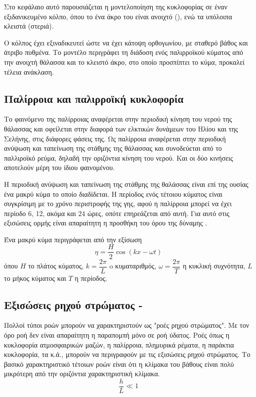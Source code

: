 Στο κεφάλαιο αυτό παρουσιάζεται η μοντελοποίηση της κυκλοφορίας σε έναν εξιδανικευμένο κόλπο, όπου το ένα άκρο του είναι ανοιχτό (), ενώ τα υπόλοιπα κλειστά (στεριά).

Ο κόλπος έχει εξιναδικευτεί ώστε να έχει κάτοψη ορθογωνίου, με σταθερό βάθος και άτριβο πυθμένα. Το μοντέλο περιγράφει τη διάδοση ενός παλιρροϊκού κύματος από την ανοιχτή θάλασσα και το κλειστό άκρο, στο οποίο προσπίπτει το κύμα, προκαλεί τέλεια ανάκλαση.
\subsection{Παλίρροια και παλιρροϊκή κυκλοφορία}
Το φαινόμενο της παλίρροιας αναφέρεται στην περιοδική κίνηση του νερού της θάλασσας και οφείλεται στην διαφορά των ελκτικών δυνάμεων του Ηλίου και της Σελήνης, στις διάφορες φάσεις της.
Ως παλίρροια αναφέρεται στην περιοδική ανύψωση και ταπείνωση της στάθμης της θάλασσας και συνοδεύεται από το παλλιροϊκό ρεύμα, δηλαδή την οριζόντια κίνηση του νερού. Και οι δύο κινήσεις αποτελούν μέρη του ίδιου φαινομένου.

Η περιοδική ανύψωση και ταπείνωση της στάθμης της θαλάσσας είναι επί της ουσίας ένα μακρύ κύμα το οποίο διαδίδεται. Η περίοδος ενός τέτοιου κύματος είναι συγκρίσιμη με το χρόνο περιστροφής της γης, αφού η παλίρροια μπορεί να έχει περίοδο 6, 12, ακόμα και 24 ώρες, οπότε επηρεάζεται από αυτή. Για αυτό στις εξισώσεις ορμής είναι απαραίτητη η προσθήκη του όρου της δύναμης \cor.

Ένα μακρύ κύμα περιγράφεται από την εξίσωση 
\begin{equation}
    η = \dfrac{H}{2}\cos{(kx-ωt)}
\end{equation}
όπου $Η$ το πλάτος κύματος, $k=\dfrac{2π}{L}$ o κυματαριθμός, $ω=\dfrac{2π}{T}$ η κυκλική συχνότητα, $L$ το μήκος κύματος και $T$ η περίοδος.

\subsection{Εξισώσεις ρηχού στρώματος - }
Πολλοί τύποι ροών μπορούν να χαρακτηριστούν ως "ροές ρηχού στρώματος". Με τον όρο ροή δεν είναι απαραίτητη η παραπομπή μόνο σε ροή ύδατος. Ροές όπως η κυκλοφορία ατμοσφαιρικών μαζών, η παλίρροια, πλημυρικά ρέματα, η παράκτια κυκλοφορία, τα  κ.ά., μπορούν να περιγραφούν με τις εξισώσεις ρηχού στρώματος. Το βασικό χαρακτηριστικό τέτοιων ροών είναι ότι η κλίμακα του βάθους είναι πολύ μικρότερη από την οριζόντια χαρακτηριστική κλίμακα.
\begin{equation}
    \dfrac{h}{L} \ll 1
\end{equation}

